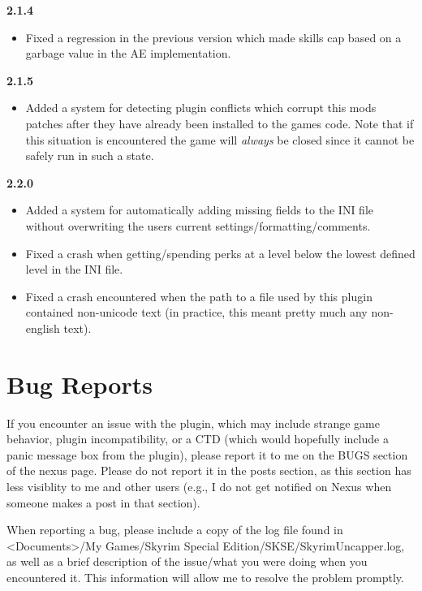 \documentclass[12pt]{amsart}
\begin{document}
\startblock
\textbf{2.1.4}
\begin{itemize}
    \item Fixed a regression in the previous version which made skills cap based
          on a garbage value in the AE implementation.
\end{itemize}
\stopblock

\startblock
\textbf{2.1.5}
\begin{itemize}
    \item Added a system for detecting plugin conflicts which corrupt this mods
          patches after they have already been installed to the games code. Note
          that if this situation is encountered the game will \emph{always} be
          closed since it cannot be safely run in such a state.
\end{itemize}
\stopblock

\startblock
\textbf{2.2.0}
\begin{itemize}
    \item Added a system for automatically adding missing fields to the INI file
          without overwriting the users current settings/formatting/comments.
    \item Fixed a crash when getting/spending perks at a level below the lowest
          defined level in the INI file.
    \item Fixed a crash encountered when the path to a file used by this plugin
          contained non-unicode text (in practice, this meant pretty much any
          non-english text).
\end{itemize}
\stopblock

\startblock
\section{Bug Reports}

If you encounter an issue with the plugin, which may include strange game
behavior, plugin incompatibility, or a CTD (which would hopefully include
a panic message box from the plugin), please report it to me on the BUGS
section of the nexus page. Please do not report it in the posts section, as
this section has less visiblity to me and other users (e.g., I do not get
notified on Nexus when someone makes a post in that section).

When reporting a bug, please include a copy of the log file found in
<Documents>/My Games/Skyrim Special Edition/SKSE/SkyrimUncapper.log,
as well as a brief description of the issue/what you were doing when you
encountered it. This information will allow me to resolve the problem promptly.
\stopblock
\end{document}
